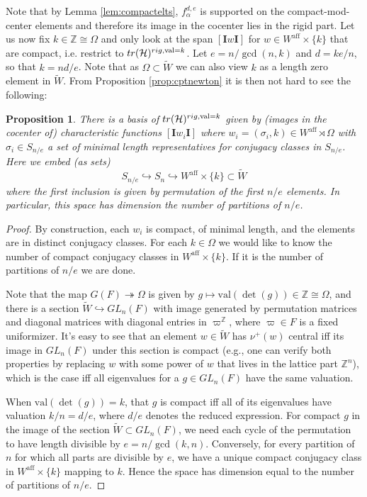 \documentclass{amsart}
\numberwithin{equation}{section}
\newtheorem{proposition}[lemma]{Proposition}%
\theoremstyle{definition}
\def\tr{{\rm tr}}
\def\val{\mathrm{val}}
\def\tilde{\widetilde}
\newcommand{\tW}{\widetilde{W}}
\newcommand{\cH}{\mathcal{H}}
\newcommand{\bI}{\mathbf{I}}
\newcommand{\Z}{{\mathbb Z}}
\newcommand{\aff}{\mathrm{aff}}
\begin{document}
Note that by Lemma \ref{lem:compactelts}, $f^{d,e}_\alpha$ is supported on the compact-mod-center elements and therefore its image in the cocenter lies in the rigid part. Let us now fix $k\in\Z\cong\Omega$ and only look at the span $[\bI w\bI]$ for $w\in W^{\aff}\times\{k\}$ that are compact, i.e. restrict to $\tr(\cH)^{rig,\val=k}$. 
Let $e=n/\gcd(n,k)$ and $d=ke/n$, so that $k=nd/e$. Note that as $\Omega\subset\tW$ we can also view $k$ as a length zero element in $\tilde{W}$. From Proposition \ref{prop:cptnewton} it is then not hard to see the following:
\begin{proposition}\label{prop:HeNiebasis}
    There is a basis of $\tr(\cH)^{rig,\val=k}$ given by (images in the cocenter of) characteristic functions $[\bI w_i\bI]$ where $w_i=(\sigma_i, k)\in W^{\aff}\rtimes \Omega$ with $\sigma_i\in S_{n/e}$ a set of minimal length representatives for conjugacy classes in $S_{n/e}$. Here we embed (as sets) $$S_{n/e}\hookrightarrow S_n\hookrightarrow W^{\aff}\times \{k\}\subset \tilde{W}$$ where the first inclusion is given by permutation of the first $n/e$ elements. In particular, this space has dimension the number of partitions of $n/e$.
\end{proposition}
\begin{proof}
    By construction, each $w_i$ is compact, of minimal length, and the elements are in distinct conjugacy classes. 
    For each $k \in\Omega$ we would like to know the number of compact conjugacy classes in $W^{\aff}\times\{k\}$. If it is the number of partitions of $n/e$ we are done. 
    
    Note that the map $G(F)\twoheadrightarrow \Omega$ is given by $g\mapsto\val(\det(g))\in\Z\cong\Omega$, and there is a section $\tW \hookrightarrow GL_n(F)$ with image generated by permutation matrices and diagonal matrices with diagonal entries in $\varpi^\Z$, where $\varpi\in F$ is a fixed uniformizer. It's easy to see that an element $w\in\tW$ has $\nu^+(w)$ central iff its image in $GL_n(F)$ under this section is compact (e.g., one can verify both properties by replacing $w$ with some power of $w$ that lives in the lattice part $\Z^n$), which is the case iff all eigenvalues for a $g\in GL_n(F)$ have the same valuation. 
    
    When $\val(\det(g))=k$, that $g$ is compact iff all of its eigenvalues have valuation $k/n=d/e$, where $d/e$ denotes the reduced expression. For compact $g$ in the image of the section $\tW \subset GL_n(F)$, we need each cycle of the permutation to have length divisible by $e=n/\gcd(k,n)$. Conversely, for every partition of $n$ for which all parts are divisible by $e$, we have a unique compact conjugacy class in $W^{\aff}\times\{k\}$ mapping to $k$. Hence the space has dimension equal to the number of partitions of $n/e$.
\end{proof}
\end{document}
